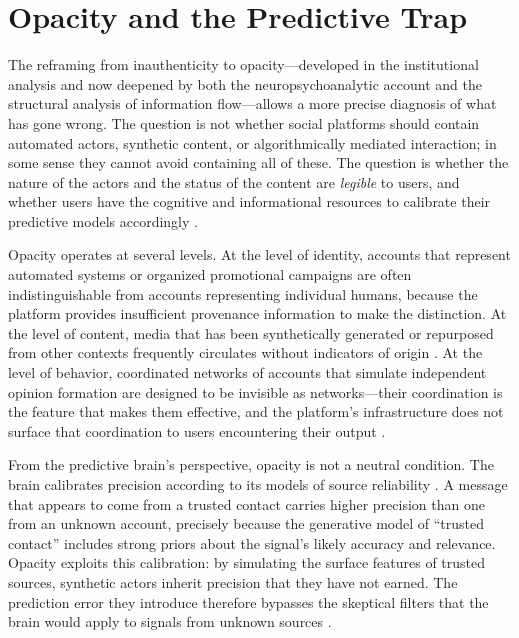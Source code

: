 \documentclass[12pt,a4paper]{article}
\begin{document}
\section{Opacity and the Predictive Trap}

The reframing from inauthenticity to opacity---developed in the institutional analysis and now
deepened by both the neuropsychoanalytic account and the structural analysis of information
flow---allows a more precise diagnosis of what has gone wrong. The question is not whether
social platforms should contain automated actors, synthetic content, or algorithmically mediated
interaction; in some sense they cannot avoid containing all of these. The question is whether
the nature of the actors and the status of the content are \emph{legible} to users, and whether
users have the cognitive and informational resources to calibrate their predictive models
accordingly \citep{gillespie2018}.

Opacity operates at several levels. At the level of identity, accounts that represent automated
systems or organized promotional campaigns are often indistinguishable from accounts representing
individual humans, because the platform provides insufficient provenance information to make the
distinction. At the level of content, media that has been synthetically generated or repurposed
from other contexts frequently circulates without indicators of origin \citep{vosoughi2018}.
At the level of behavior, coordinated networks of accounts that simulate independent opinion
formation are designed to be invisible as networks---their coordination is the feature that makes
them effective, and the platform's infrastructure does not surface that coordination to users
encountering their output \citep{tufekci2015}.

From the predictive brain's perspective, opacity is not a neutral condition. The brain calibrates
precision according to its models of source reliability \citep{friston2013}. A message that
appears to come from a trusted contact carries higher precision than one from an unknown account,
precisely because the generative model of ``trusted contact'' includes strong priors about the
signal's likely accuracy and relevance. Opacity exploits this calibration: by simulating the
surface features of trusted sources, synthetic actors inherit precision that they have not earned.
The prediction error they introduce therefore bypasses the skeptical filters that the brain would
apply to signals from unknown sources \citep{dallaglio2024,solms2021}.
\end{document}
